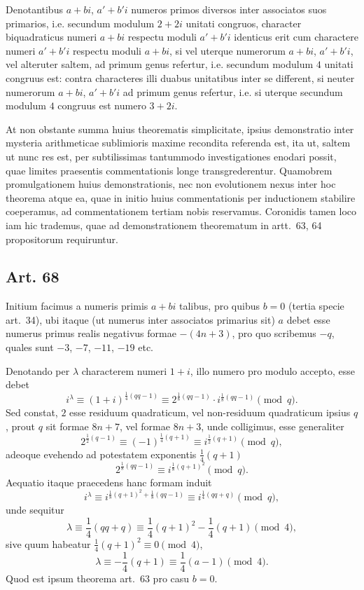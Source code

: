 \documentclass[12pt]{article}
\newcommand{\art}[1]{\subsection*{Art. #1}}
\begin{document}
Denotantibus $a+bi$, $a'+b'i$ numeros primos diversos inter associatos suos primarios, i.e. secundum modulum $2+2i$ unitati congruos, character biquadraticus numeri $a+bi$ respectu moduli $a'+b'i$ identicus erit cum charactere numeri $a'+b'i$ respectu moduli $a+bi$, si vel uterque numerorum $a+bi$, $a'+b'i$, vel alteruter saltem, ad primum genus refertur, i.e. secundum modulum $4$ unitati congruus est: contra characteres illi duabus unitatibus inter se different, si neuter numerorum $a+bi$, $a'+b'i$ ad primum genus refertur, i.e. si uterque secundum modulum $4$ congruus est numero $3+2i$.

At non obstante summa huius theorematis simplicitate, ipsius demonstratio inter mysteria arithmeticae sublimioris maxime recondita referenda est, ita ut, saltem ut nunc res est, per subtilissimas tantummodo investigationes enodari possit, quae limites praesentis commentationis longe transgrederentur. Quamobrem promulgationem huius demonstrationis, nec non evolutionem nexus inter hoc theorema atque ea, quae in initio huius commentationis per inductionem stabilire coeperamus, ad commentationem tertiam nobis reservamus. Coronidis tamen loco iam hic trademus, quae ad demonstrationem theorematum in artt.~63, 64 propositorum requiruntur.

\art{68}
Initium facimus a numeris primis $a+bi$ talibus, pro quibus $b=0$ (tertia specie art.~34), ubi itaque (ut numerus inter associatos primarius sit) $a$ debet esse numerus primus realis negativus formae $-(4n+3)$, pro quo scribemus $-q$, quales sunt $-3$, $-7$, $-11$, $-19$ etc.

Denotando per $\lambda$ characterem numeri $1+i$, illo numero pro modulo accepto, esse debet
\[
i^\lambda \equiv (1+i)^{\frac14(qq-1)}
       \equiv 2^{\frac18(qq-1)}\cdot i^{\frac18(qq-1)}
       \pmod q.
\]
Sed constat, $2$ esse residuum quadraticum, vel non-residuum quadraticum ipsius $q$, prout $q$ sit formae $8n+7$, vel formae $8n+3$, unde colligimus, esse generaliter
\[
2^{\frac12(q-1)}\equiv (-1)^{\frac14(q+1)}
      \equiv i^{\frac12(q+1)}\pmod q,
\]
adeoque evehendo ad potestatem exponentis $\frac14(q+1)$
\[
2^{\frac18(qq-1)}\equiv i^{\frac18(q+1)^2}\pmod q.
\]
Aequatio itaque praecedens hanc formam induit
\[
i^\lambda\equiv i^{\frac18(q+1)^2+\frac18(qq-1)}
      \equiv i^{\frac14(qq+q)}\pmod q,
\]
unde sequitur
\[
\lambda\equiv \frac14(qq+q)
      \equiv \frac14(q+1)^2-\frac14(q+1)\pmod4,
\]
sive quum habeatur $\frac14(q+1)^2\equiv0\pmod4$,
\[
\lambda\equiv-\frac14(q+1)\equiv\frac14(a-1)\pmod4.
\]
Quod est ipsum theorema art.~63 pro casu $b=0$.
\end{document}
